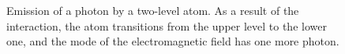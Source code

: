 \begin{figure}
\centering



\caption{Emission of a photon by a two-level atom. As a result
  of the interaction, the atom transitions from the upper level to the lower one, and the mode
  of the electromagnetic field has one more photon.}
\label{figPart1Ch2_4}
\end{figure}